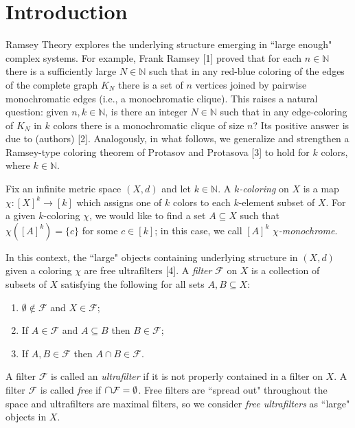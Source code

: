 \section{Introduction}
Ramsey Theory explores the underlying structure emerging in ``large enough" complex systems. For example, Frank Ramsey [1] proved that for each \( n \in \mathbb{N}  \) there is a sufficiently large \( N \in \mathbb{N}  \) such that in any red-blue coloring of the edges of the complete graph \( K_{N} \) there is a set of \( n \) vertices joined by pairwise monochromatic edges (i.e., a monochromatic clique).  This raises a natural question: given \( n, k \in \mathbb{N}  \), is there an integer \( N \in \mathbb{N} \) such that in any edge-coloring of \( K_{N}  \) in \( k \) colors there is a monochromatic clique of size \( n \)? Its positive answer is due to (authors) [2]. Analogously, in what follows, we generalize and strengthen a Ramsey-type coloring theorem of Protasov and Protasova [3] to hold for $k$ colors, where \( k \in \mathbb{N}  \).

Fix an infinite metric space \( (X,d) \) and let \( k \in \mathbb{N}  \). A \emph{\( k \)-coloring} on \( X \) is a map \( \chi : [X]^{k} \to [k]  \) which assigns one of \( k \) colors to each \( k \)-element subset of \( X \). For a given \( k \)-coloring \( \chi \), we would like to find a set \( A \subseteq X \) such that \( \chi ([A]^{k}) = \{ c \}  \) for some \( c \in [k] \); in this case, we call \( [A]^{k}  \) \emph{\( \chi \)-monochrome}.

In this context, the ``large" objects containing underlying structure in \( (X,d) \) given a coloring \( \chi \) are free ultrafilters [4]. A \emph{filter} \( \mathcal{F}  \) on \( X \) is a collection of subsets of \( X \) satisfying the following for all sets \( A, B \subseteq X \):
\begin{enumerate}[leftmargin=1.2cm]
	\item \( \emptyset  \notin \mathcal{F}  \) and \( X \in \mathcal{F}  \);
	\item If \( A \in \mathcal{F} \) and \( A \subseteq B \) then \( B \in \mathcal{F}  \);
	\item If \( A, B \in \mathcal{F}  \) then \( A \cap B \in \mathcal{F}  \).
\end{enumerate}
A filter \( \mathcal{F}  \) is called an \emph{ultrafilter} if it is not properly contained in a filter on \( X \). A filter \( \mathcal{F}  \) is called \emph{free} if \( \medcap \mathcal{F} = \emptyset  \). Free filters are ``spread out" throughout the space and ultrafilters are maximal filters, so we consider \emph{free ultrafilters} as ``large" objects in \( X \).

